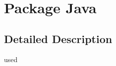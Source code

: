 \hypertarget{namespaceJava}{}\section{Package Java}
\label{namespaceJava}


\subsection{Detailed Description}
used 